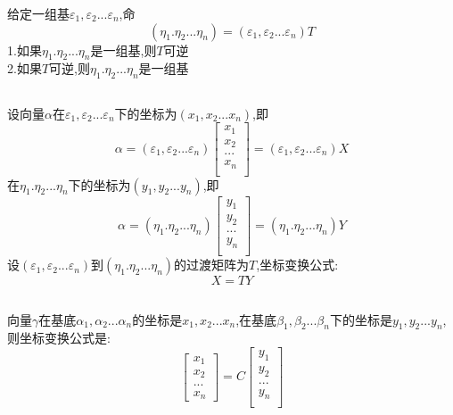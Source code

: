 \documentclass[11pt, a4paper, UTF8]{ctexart}
\begin{document}
\subsubsection{}
给定一组基$\varepsilon_1,\varepsilon_2...\varepsilon_n$,命
\[(\eta_1.\eta_2...\eta_n)=(\varepsilon_1,\varepsilon_2...\varepsilon_n)T\]
1.如果$\eta_1.\eta_2...\eta_n$是一组基,则$T$可逆\\
2.如果$T$可逆,则$\eta_1.\eta_2...\eta_n$是一组基
\subsection{}
设向量$\alpha$在$\varepsilon_1,\varepsilon_2...\varepsilon_n$下的坐标为$(x_1,x_2...x_n)$,即
\[\alpha=(\varepsilon_1,\varepsilon_2...\varepsilon_n)\begin{bmatrix}
x_1\\
x_2\\
...\\
x_n\\
\end{bmatrix}=(\varepsilon_1,\varepsilon_2...\varepsilon_n)X\]
在$\eta_1.\eta_2...\eta_n$下的坐标为$(y_1,y_2...y_n)$,即\\
\[\alpha=(\eta_1.\eta_2...\eta_n)\begin{bmatrix}
y_1\\
y_2\\
...\\
y_n\\
\end{bmatrix}=(\eta_1.\eta_2...\eta_n)Y\]
设$(\varepsilon_1,\varepsilon_2...\varepsilon_n)$到$(\eta_1.\eta_2...\eta_n)$的过渡矩阵为$T$,坐标变换公式:
\[X=TY\]
\subsection{}
向量$\gamma$在基底$\alpha_1,\alpha_2...\alpha_n$的坐标是$x_1,x_2...x_n$,在基底$\beta_1,\beta_2...\beta_n$下的坐标是$y_1,y_2...y_n$,则坐标变换公式是:\\
\[\begin{bmatrix}
x_1\\
x_2\\
...\\
x_n
\end{bmatrix}=C
\begin{bmatrix}
y_1\\
y_2\\
...\\
y_n\\
\end{bmatrix}\]
\end{document}
